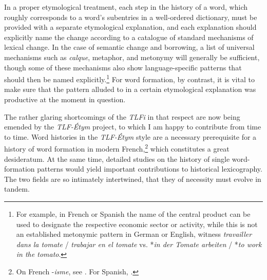 \documentclass[output=paper]{langsci/langscibook}
\begin{document}
In a proper etymological treatment, each step in the history of a word,
which roughly corresponds to a word's subentries in a well-ordered
dictionary, must be provided with a separate etymological explanation,
and each explanation should explicitly name the change according to a
catalogue of standard mechanisms of lexical change. In the case of
semantic change and borrowing, a list of universal mechanisms such as
\emph{calque}, metaphor, and metonymy will generally be sufficient,
though some of these mechanisms also show language-specific
patterns that should then be named explicitly.\footnote{For example, in French or Spanish the name of the
  central product can be used to designate the respective economic
  sector or activity, while this is not an established metonymic pattern
  in German or English, witness \emph{travailler dans la tomate} /
  \emph{trabajar en el tomate} vs. *\emph{in der Tomate arbeiten} /
  *\emph{to work in the tomato}.}
For word formation, by contrast, it is vital to make sure that the
pattern alluded to in a certain etymological explanation was productive
at the moment in question.

The rather glaring shortcomings of the \emph{TLFi} in that respect are
now being emended by the \emph{TLF-Étym} project, to which I am happy to
contribute from time to time. Word histories in the \emph{TLF-Étym}
style are a necessary prerequisite for a history of word formation in
modern French,\footnote{On French -\emph{isme}, see %
\citet{roche2007.isme-decembrettes}%
%
. For
  Spanish, %
\citet{Munoz12}%
%
.} which constitutes a great desideratum. 
At the same time, detailed studies on the history of single
word-formation patterns would yield important contributions to
historical lexicography. The two fields are so intimately intertwined,
that they of necessity must evolve in tandem.



\nocite{Aronoff2007}
\nocite{Barbier44}
\nocite{Blank97}
\nocite{Braudel79}
\nocite{Corbin87}
\nocite{Dauzat72}
\nocite{Febvre39}
\nocite{Fradin03}
\nocite{Hilger82}
\nocite{Hoefer86}
\nocite{Munoz12}
\nocite{OED}
\nocite{Passow27}
\nocite{Rainer98}
\nocite{Rainer17}
\nocite{roche2007.isme-decembrettes}
\nocite{Hart93}
\nocite{Thiele74}
\nocite{wolf72}




{\sloppy
    \printbibliography[heading=subbibliography,notkeyword=this]
}
\end{document}
